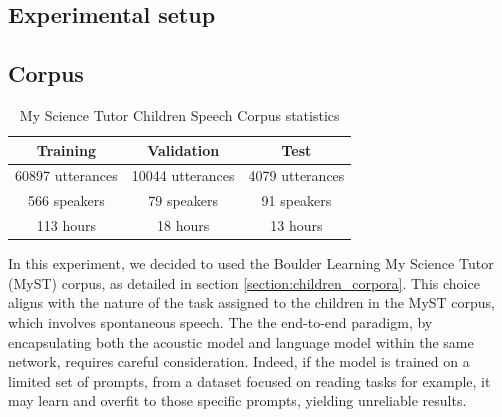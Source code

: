 
\subsection{Experimental setup}
\label{section:methods_chapter4}

\subsection{Corpus}
\begin{table}[ht]
\centering
\begin{tabular}{c|c|c}
\hline
 Training & Validation     & Test   \\ \hline
60897 utterances  & 10044 utterances   & 4079 utterances \\ 
 566 speakers  & 79 speakers   & 91 speakers \\ 
 113 hours  & 18 hours   & 13 hours \\ \hline

\end{tabular}
\caption{My Science Tutor Children Speech Corpus statistics}
\label{tab:statistics_myst}
\end{table}
In this experiment, we decided to used  the Boulder Learning My Science Tutor (MyST) corpus, as detailed in section \ref{section:children_corpora}. This choice aligns with the nature of the task assigned to the children in the MyST corpus, which involves spontaneous speech. The the end-to-end paradigm, by encapsulating both the acoustic model and language model within the same network, requires careful consideration. Indeed, if the model is trained on a limited set of prompts, from a dataset focused on reading tasks for example, it may learn and overfit to those specific prompts, yielding unreliable results.

